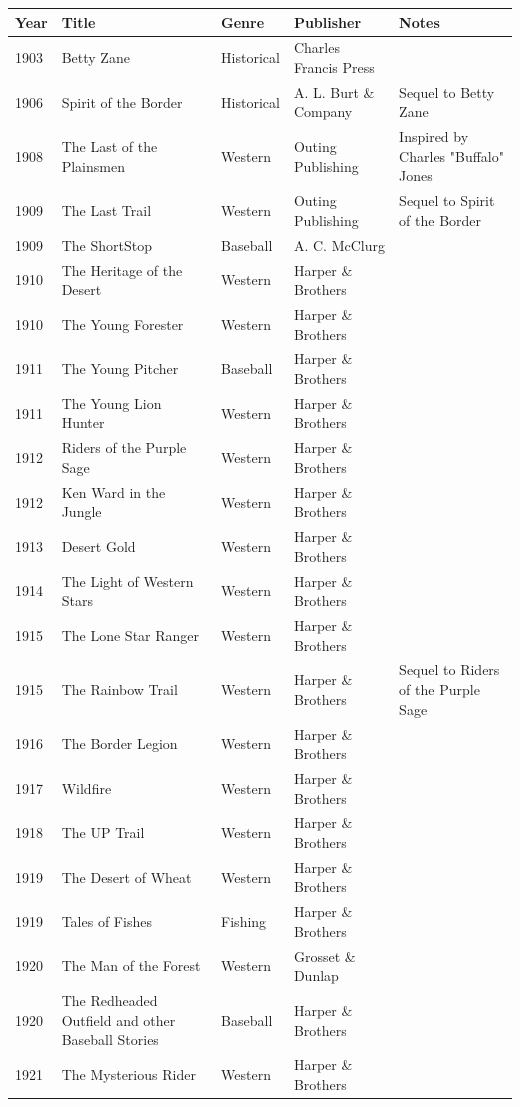 \documentclass{article}
\begin{document}
\begin{tabular}{lllll}
\toprule
Year & Title & Genre & Publisher & Notes \\
\midrule
1903 & Betty Zane & Historical & Charles Francis Press &  \\
1906 & Spirit of the Border & Historical & A. L. Burt \& Company & Sequel to Betty Zane \\
1908 & The Last of the Plainsmen & Western & Outing Publishing & Inspired by Charles "Buffalo" Jones \\
1909 & The Last Trail & Western & Outing Publishing & Sequel to Spirit of the Border \\
1909 & The ShortStop & Baseball & A. C. McClurg &  \\
1910 & The Heritage of the Desert & Western & Harper \& Brothers &  \\
1910 & The Young Forester & Western & Harper \& Brothers &  \\
1911 & The Young Pitcher & Baseball & Harper \& Brothers &  \\
1911 & The Young Lion Hunter & Western & Harper \& Brothers &  \\
1912 & Riders of the Purple Sage & Western & Harper \& Brothers &  \\
1912 & Ken Ward in the Jungle & Western & Harper \& Brothers &  \\
1913 & Desert Gold & Western & Harper \& Brothers &  \\
1914 & The Light of Western Stars & Western & Harper \& Brothers &  \\
1915 & The Lone Star Ranger & Western & Harper \& Brothers &  \\
1915 & The Rainbow Trail & Western & Harper \& Brothers & Sequel to Riders of the Purple Sage \\
1916 & The Border Legion & Western & Harper \& Brothers &  \\
1917 & Wildfire & Western & Harper \& Brothers &  \\
1918 & The UP Trail & Western & Harper \& Brothers &  \\
1919 & The Desert of Wheat & Western & Harper \& Brothers &  \\
1919 & Tales of Fishes & Fishing & Harper \& Brothers &  \\
1920 & The Man of the Forest & Western & Grosset \& Dunlap &  \\
1920 & The Redheaded Outfield and other Baseball Stories & Baseball & Harper \& Brothers &  \\
1921 & The Mysterious Rider & Western & Harper \& Brothers &  \\

\end{tabular}
\end{document}

